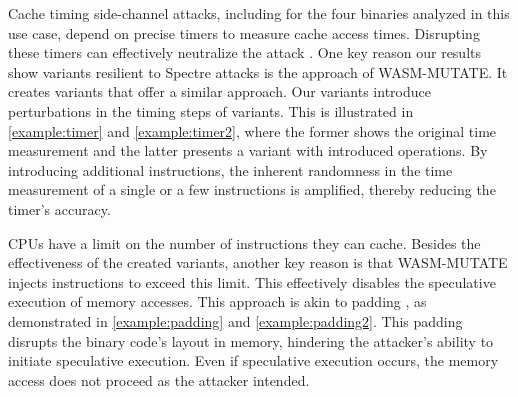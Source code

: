 \begin{strategy}
    Cache timing side-channel attacks, including for the four binaries analyzed in this use case, depend on precise timers to measure cache access times. 
    Disrupting these timers can effectively neutralize the attack \cite{JStimers}.  
    One key reason our results show variants resilient to Spectre attacks is the approach of WASM-MUTATE. 
    It creates variants that offer a similar approach.
    Our \Wasm variants introduce perturbations in the timing steps of \Wasm variants. 
    This is illustrated in \autoref{example:timer} and \autoref{example:timer2}, where the former shows the original time measurement and the latter presents a variant with introduced operations.
    By introducing additional instructions, the inherent randomness in the time measurement of a single or a few instructions is amplified, thereby reducing the timer's accuracy.

\end{strategy}



\begin{strategy}
    CPUs have a limit on the number of instructions they can cache. 
    Besides the effectiveness of the created variants, another key reason is that WASM-MUTATE injects instructions to exceed this limit. 
    This effectively disables the speculative execution of memory accesses.
    This approach is akin to padding \cite{padding}, as demonstrated in \autoref{example:padding} and \autoref{example:padding2}.
    This padding disrupts the binary code's layout in memory, hindering the attacker's ability to initiate speculative execution. 
    Even if speculative execution occurs, the memory access does not proceed as the attacker intended.
    
\end{strategy}




    


